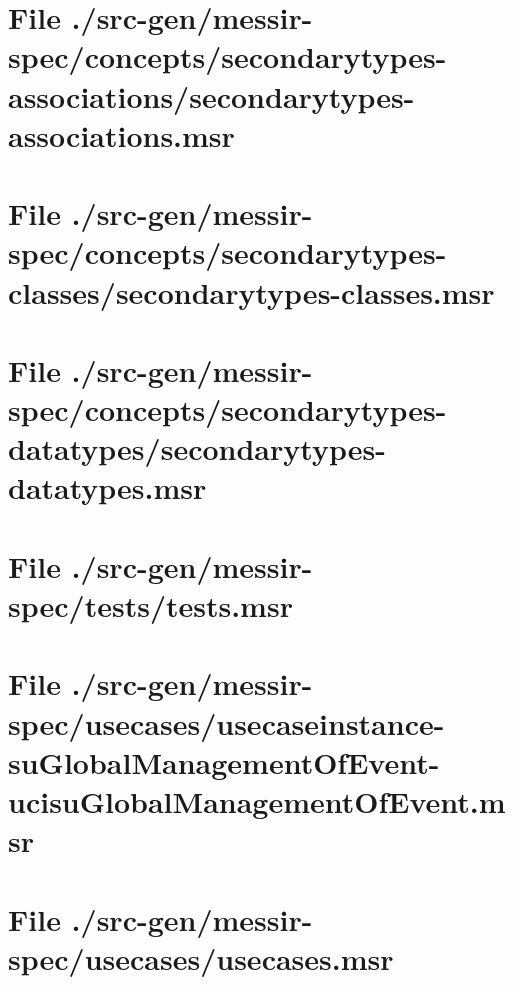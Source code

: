 \section[File /src-gen/messir-spec/concepts.../secondarytypes-associations.msr]{File ./src-gen/messir-spec/concepts/secondarytypes-associations/secondarytypes-associations.msr}
\scriptsize

\normalsize
	
\section[File /src-gen/messir-spec/concepts.../secondarytypes-classes.msr]{File ./src-gen/messir-spec/concepts/secondarytypes-classes/secondarytypes-classes.msr}
\scriptsize

\normalsize
	
\section[File /src-gen/messir-spec/concepts.../secondarytypes-datatypes.msr]{File ./src-gen/messir-spec/concepts/secondarytypes-datatypes/secondarytypes-datatypes.msr}
\scriptsize

\normalsize
	
\section[File /src-gen/messir-spec/tests/tests.msr]{File ./src-gen/messir-spec/tests/tests.msr}
\scriptsize

\normalsize
	
\section[File /.../usecaseinstance-suGlobalManagementOfEvent-ucisuGlobalManagementOfEvent.msr]{File ./src-gen/messir-spec/usecases/usecaseinstance-suGlobalManagementOfEvent-ucisuGlobalManagementOfEvent.msr}
\scriptsize

\normalsize
	
\section[File /src-gen/messir-spec/usecases/usecases.msr]{File ./src-gen/messir-spec/usecases/usecases.msr}
\scriptsize

\normalsize
	
